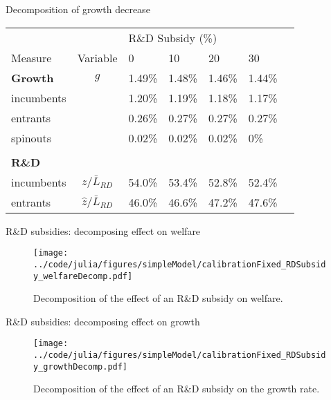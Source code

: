 \documentclass[english,usenames,dvipsnames]{beamer}
\begin{document}
\begin{frame}{Decomposition of growth decrease}\label{rd_subsidies:decomposition_growth_decrease}
	\hyperlink{RDsubsidy_table}{}
	\begin{table}
		\centering
		\small
		\begin{tabular}{lclllll}
			\toprule \toprule
			&  & \multicolumn{4}{l}{R\&D Subsidy (\%)} \vspace{3pt} \tabularnewline
			Measure &Variable & 0 & 10 & 20 & 30 \tabularnewline
			\midrule
			\textbf{Growth} & $g$ & 1.49\% & 1.48\% & 1.46\% & 1.44\% \tabularnewline
			\multicolumn{1}{l}{\quad incumbents} & & 1.20\% & 1.19\% & 1.18\% & 1.17\% \tabularnewline
			\multicolumn{1}{l}{\quad entrants} & & 0.26\% & 0.27\% & 0.27\% & 0.27\% \tabularnewline
			\multicolumn{1}{l}{\quad spinouts} &  & 0.02\% & 0.02\% & 0.02\% & 0\% \tabularnewline
			\tabularnewline
			\textbf{R\&D} & &  &  &  & \tabularnewline
			\multicolumn{1}{l}{\quad incumbents} & $z / \bar{L}_{RD}$ & 54.0\% & 53.4\% & 52.8\% & 52.4\% \tabularnewline
			\multicolumn{1}{l}{\quad entrants} & $\hat{z} / \bar{L}_{RD}$ & 46.0\% & 46.6\% & 47.2\% & 47.6\% \tabularnewline
			\bottomrule
		\end{tabular}
	\end{table}
\end{frame}

\begin{frame}{R\&D subsidies: decomposing effect on welfare} \label{plots:rd_subsidies1} 
	\hyperlink{RDsubsidy_table}{}
	\begin{figure}[]
		\texttt{[image: ../code/julia/figures/simpleModel/calibrationFixed\_RDSubsidy\_welfareDecomp.pdf]}
		\caption{Decomposition of the effect of an R\&D subsidy on welfare.}
		\label{calibration_RDSubsidy_welfareDecomp}
	\end{figure}
\end{frame}

\begin{frame}{R\&D subsidies: decomposing effect on growth} \label{plots:rd_subsidies2} 
	\hyperlink{RDsubsidy_table}{}
	\begin{figure}[]
		\texttt{[image: ../code/julia/figures/simpleModel/calibrationFixed\_RDSubsidy\_growthDecomp.pdf]}
		\caption{Decomposition of the effect of an R\&D subsidy on the growth rate.}
		\label{calibration_RDSubsidy_growthDecomp}
	\end{figure}
\end{frame}
\end{document}
